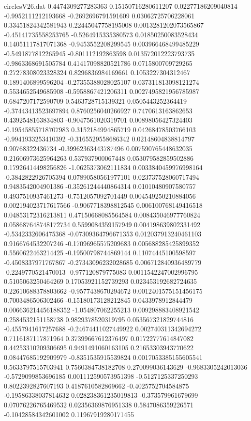 \begin{filecontents}{circlesV26.dat}
0.4474309277283363	0.15150716280611207	0.02277186209040814
-0.9952111212193668	-0.2692696791591609	0.03062725706228061
0.33451824342581943	0.22445047758195008	0.0013281202073565867
-0.45141735558253765	-0.5264915335380573	0.01850250083528434
0.14051117817071368	-0.9453552208299545	0.003966468499485229
-0.5491877812265945	-0.801112192863598	0.013572012223793735
-0.9863368691505784	0.41417098820521786	0.0715800709729265
0.27278308023328324	0.8296836984169661	0.1053227304312467
0.1891406899596204	-0.27355388028025107	0.037311813098121274
0.5534652549685908	-0.5958867421206311	0.0027495821956785987
0.6847207172590709	0.5463728715139321	0.0505443252364419
-0.37443413523697894	0.8760256040266927	0.7470613163862653
0.4392548163834803	-0.9047561020319701	0.00898056427324403
-0.19545855718707983	0.3152184994865719	0.04268478503766103
-0.9941933253410392	-0.3165529558686342	0.02148604838814797
0.90768322436734	-0.39962363443787496	0.007590765448632035
0.21606973625964263	0.537937900067448	0.053079582859502886
0.17926414498256826	-1.0625373062111834	0.0033840459976998164
-0.3842822926705394	0.07890580561977101	0.023737528060717494
0.9483542004901386	-0.35261244440864314	0.01010480907580757
0.4937510937461273	-0.7512057092701449	0.004549250210884056
0.002194023717617566	-0.9067718398812545	0.006100768149416518
0.04853172316213811	0.47150668085564584	0.008435046977760824
0.058687648748172734	0.5599084359157949	0.004198639802331492
-0.5342332606475368	-0.07309364796671353	0.012037913240461103
0.9166764532207246	-0.17096965575209683	0.005688285425899352
0.5560622463214425	-0.19500798744869144	0.11074445100598597
-0.4508337971767867	-0.27343096232028685	0.006712840936489779
-0.2249770521470013	-0.977120879775083	0.0011542247002996795
0.5105063250464269	0.17053921152739293	0.023453192682724635
0.22610688378803662	-0.9577438670294672	0.0012401575151456175
0.7003486506302466	-0.15180173128212845	0.0433978912844479
0.006636214456188352	-1.054807062255213	0.009298883408921542
0.2584532151158738	0.9829378520319795	0.053567321829744816
-0.4557941617257688	-0.24674411027449922	0.002740311342694272
0.7116187117871964	0.37399667612376497	0.01722777614847082
0.44253310209306695	0.9491491060163105	0.21653303943770622
0.08447685192909979	-0.8351535915539824	0.0017053385155605541
0.5633797515703941	0.7560384738182708	0.270099036143629
-0.9683305242013036	-0.5729099853696185	0.001112590573951398
-0.5127125337250293	0.8022392827607193	0.4187610582869662
-0.4025752704584875	-0.19586338037814632	0.028238361235019813
-0.373579961679699	0.07076226765469532	0.02356369876951338
0.5847086359226571	-0.10428584342601002	0.11967919280171455

\end{filecontents}
